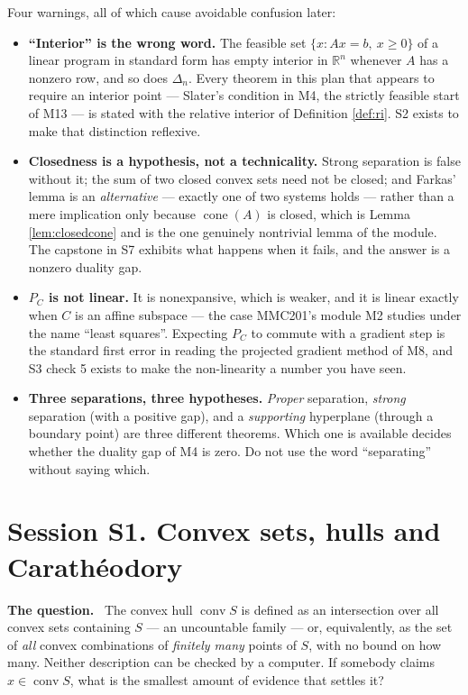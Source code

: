 \documentclass[11pt,a4paper]{article}
\newcommand{\mpart}[1]{\smallskip\noindent\textbf{#1}\ \ignorespaces}
\theoremstyle{definition}
\theoremstyle{plain}
\theoremstyle{remark}
\newcommand{\R}{\mathbb{R}}
\newcommand{\proj}{P}
\DeclareMathOperator{\conv}{conv}
\DeclareMathOperator{\cone}{cone}
\newcommand{\Simplex}{\Delta}
\begin{document}
Four warnings, all of which cause avoidable confusion later:

\begin{itemize}
\item \textbf{``Interior'' is the wrong word.} The feasible set $\{x:Ax=b,\ x\ge0\}$ of a linear
program in standard form has empty interior in $\R^n$ whenever $A$ has a nonzero row, and so
does $\Simplex_n$. Every theorem in this plan that appears to require an interior point ---
Slater's condition in M4, the strictly feasible start of M13 --- is stated with the relative
interior of Definition \ref{def:ri}. S2 exists to make that distinction reflexive.

\item \textbf{Closedness is a hypothesis, not a technicality.} Strong separation is false
without it; the sum of two closed convex sets need not be closed; and Farkas' lemma is an
\emph{alternative} --- exactly one of two systems holds --- rather than a mere implication only
because $\cone(A)$ is closed, which is Lemma \ref{lem:closedcone} and is the one genuinely
nontrivial lemma of the module. The capstone in S7 exhibits what happens when it fails, and the
answer is a nonzero duality gap.

\item \textbf{$\proj_C$ is not linear.} It is nonexpansive, which is weaker, and it is linear
exactly when $C$ is an affine subspace --- the case MMC201's module M2 studies under the name
``least squares''. Expecting $\proj_C$ to commute with a gradient step is the standard first
error in reading the projected gradient method of M8, and S3 check 5 exists to make the
non-linearity a number you have seen.

\item \textbf{Three separations, three hypotheses.} \emph{Proper} separation, \emph{strong}
separation (with a positive gap), and a \emph{supporting} hyperplane (through a boundary point)
are three different theorems. Which one is available decides whether the duality gap of M4 is
zero. Do not use the word ``separating'' without saying which.
\end{itemize}

\clearpage

\section{Session S1. Convex sets, hulls and Carath\'eodory}

\mpart{The question.} The convex hull $\conv S$ is defined as an intersection over all convex
sets containing $S$ --- an uncountable family --- or, equivalently, as the set of \emph{all}
convex combinations of \emph{finitely many} points of $S$, with no bound on how many. Neither
description can be checked by a computer. If somebody claims $x\in\conv S$, what is the smallest
amount of evidence that settles it?
\end{document}
